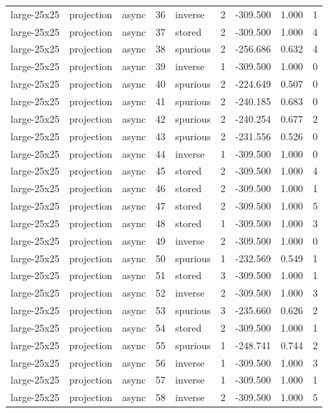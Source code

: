 \begin{tabular}{lllrlrrrr}
large-25x25 & projection & async & 36 & inverse & 2 & -309.500 & 1.000 & 1 \\
large-25x25 & projection & async & 37 & stored & 2 & -309.500 & 1.000 & 4 \\
large-25x25 & projection & async & 38 & spurious & 2 & -256.686 & 0.632 & 4 \\
large-25x25 & projection & async & 39 & inverse & 1 & -309.500 & 1.000 & 0 \\
large-25x25 & projection & async & 40 & spurious & 2 & -224.649 & 0.507 & 0 \\
large-25x25 & projection & async & 41 & spurious & 2 & -240.185 & 0.683 & 0 \\
large-25x25 & projection & async & 42 & spurious & 2 & -240.254 & 0.677 & 2 \\
large-25x25 & projection & async & 43 & spurious & 2 & -231.556 & 0.526 & 0 \\
large-25x25 & projection & async & 44 & inverse & 1 & -309.500 & 1.000 & 0 \\
large-25x25 & projection & async & 45 & stored & 2 & -309.500 & 1.000 & 4 \\
large-25x25 & projection & async & 46 & stored & 2 & -309.500 & 1.000 & 1 \\
large-25x25 & projection & async & 47 & stored & 2 & -309.500 & 1.000 & 5 \\
large-25x25 & projection & async & 48 & stored & 1 & -309.500 & 1.000 & 3 \\
large-25x25 & projection & async & 49 & inverse & 2 & -309.500 & 1.000 & 0 \\
large-25x25 & projection & async & 50 & spurious & 1 & -232.569 & 0.549 & 1 \\
large-25x25 & projection & async & 51 & stored & 3 & -309.500 & 1.000 & 1 \\
large-25x25 & projection & async & 52 & inverse & 2 & -309.500 & 1.000 & 3 \\
large-25x25 & projection & async & 53 & spurious & 3 & -235.660 & 0.626 & 2 \\
large-25x25 & projection & async & 54 & stored & 2 & -309.500 & 1.000 & 1 \\
large-25x25 & projection & async & 55 & spurious & 1 & -248.741 & 0.744 & 2 \\
large-25x25 & projection & async & 56 & inverse & 1 & -309.500 & 1.000 & 3 \\
large-25x25 & projection & async & 57 & inverse & 1 & -309.500 & 1.000 & 1 \\
large-25x25 & projection & async & 58 & inverse & 2 & -309.500 & 1.000 & 5 \\

\end{tabular}
